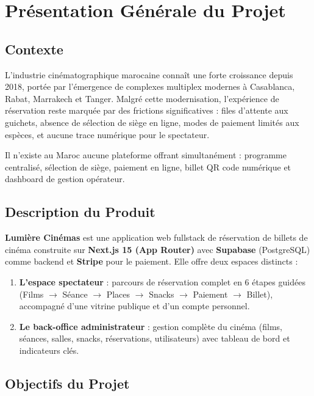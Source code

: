 \documentclass[12pt,a4paper,openany]{report}
\begin{document}
\chapter{Présentation Générale du Projet}

\section{Contexte}

L'industrie cinématographique marocaine connaît une forte croissance depuis 2018, portée par l'émergence de complexes multiplex modernes à Casablanca, Rabat, Marrakech et Tanger. Malgré cette modernisation, l'expérience de réservation reste marquée par des frictions significatives : files d'attente aux guichets, absence de sélection de siège en ligne, modes de paiement limités aux espèces, et aucune trace numérique pour le spectateur.

Il n'existe au Maroc aucune plateforme offrant simultanément : programme centralisé, sélection de siège, paiement en ligne, billet QR code numérique et dashboard de gestion opérateur.

\section{Description du Produit}

\textbf{Lumière Cinémas} est une application web fullstack de réservation de billets de cinéma construite sur \textbf{Next.js 15 (App Router)} avec \textbf{Supabase} (PostgreSQL) comme backend et \textbf{Stripe} pour le paiement. Elle offre deux espaces distincts :

\begin{enumerate}
  \item \textbf{L'espace spectateur} : parcours de réservation complet en 6 étapes guidées (Films $\rightarrow$ Séance $\rightarrow$ Places $\rightarrow$ Snacks $\rightarrow$ Paiement $\rightarrow$ Billet), accompagné d'une vitrine publique et d'un compte personnel.
  \item \textbf{Le back-office administrateur} : gestion complète du cinéma (films, séances, salles, snacks, réservations, utilisateurs) avec tableau de bord et indicateurs clés.
\end{enumerate}

\section{Objectifs du Projet}
\end{document}
